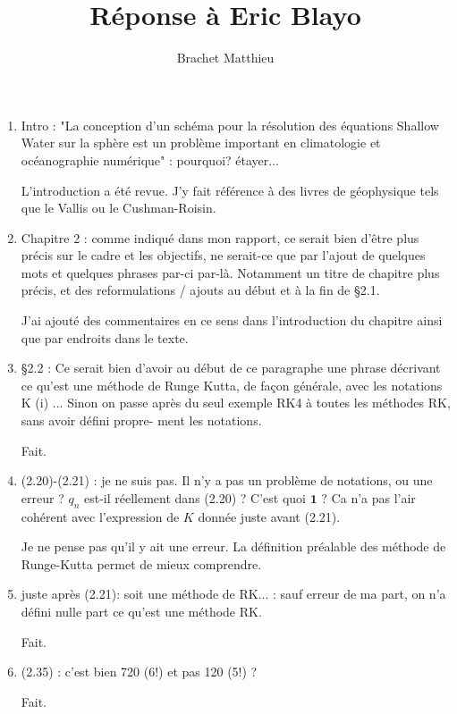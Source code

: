 \documentclass[10pt,a4paper]{article}
\author{Brachet Matthieu}
\title{Réponse à Eric Blayo}
\begin{document}

\begin{enumerate}
\item Intro : "La conception d'un schéma pour la résolution des équations Shallow Water sur la sphère est un problème important en climatologie et océanographie numérique" : pourquoi? étayer...

{\color{blue} L'introduction a été revue. J'y fait référence à des livres de géophysique tels que le Vallis ou le Cushman-Roisin.} 

\item Chapitre 2 : comme indiqué dans mon rapport, ce serait bien d’être plus précis sur le
cadre et les objectifs, ne serait-ce que par l’ajout de quelques mots et quelques phrases
par-ci par-là. Notamment un titre de chapitre plus précis, et des reformulations /
ajouts au début et à la fin de §2.1.

{\color{blue} J'ai ajouté des commentaires en ce sens dans l'introduction du chapitre ainsi que par endroits dans le texte.} 

\item §2.2 : Ce serait bien d’avoir au début de ce paragraphe une phrase décrivant ce qu’est
une méthode de Runge Kutta, de façon générale, avec les notations K (i) ... Sinon on
passe après du seul exemple RK4 à toutes les méthodes RK, sans avoir défini propre-
ment les notations.

{\color{blue} Fait.} 


\item (2.20)-(2.21) : je ne suis pas. Il n’y a pas un problème de notations, ou une erreur ? $q_n$
est-il réellement dans (2.20) ? C’est quoi $\mathbf{1}$ ? Ca n’a pas l’air cohérent avec l’expression
de $K$ donnée juste avant (2.21).

{\color{blue} Je ne pense pas qu'il y ait une erreur. La définition préalable des méthode de Runge-Kutta permet de mieux comprendre.} 


\item juste après (2.21): soit une méthode de RK... : sauf erreur de ma part, on n’a défini nulle part ce qu’est une méthode RK.

{\color{blue} Fait.} 


\item (2.35) : c’est bien 720 (6!) et pas 120 (5!) ?

{\color{blue} Fait.} 


\end{enumerate}
\end{document}
